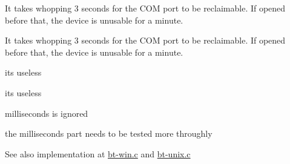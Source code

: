 
\begin{DoxyRefList}
\item[\label{bug__bug000006}%
\hypertarget{bug__bug000006}{}%
global\+Scope$>$ Global \hyperlink{btserial_8h_ac55022b02ba1040cb1ee132abd82e989}{bt\+\_\+close} (void $\ast$)]It takes whopping 3 seconds for the C\+O\+M port to be reclaimable. If opened before that, the device is unusable for a minute.  
\item[\label{bug__bug000006}%
\hypertarget{bug__bug000006}{}%
global\+Scope$>$ Global \hyperlink{btserial_8h_ac55022b02ba1040cb1ee132abd82e989}{bt\+\_\+close} (void $\ast$)]It takes whopping 3 seconds for the C\+O\+M port to be reclaimable. If opened before that, the device is unusable for a minute.  
\item[\label{bug__bug000009}%
\hypertarget{bug__bug000009}{}%
global\+Scope$>$ Global \hyperlink{btserial_8h_ad7be1494a76a1058ec4ba51588a09109}{bt\+\_\+error} (void $\ast$device)]it\textquotesingle{}s useless  
\item[\label{bug__bug000009}%
\hypertarget{bug__bug000009}{}%
global\+Scope$>$ Global \hyperlink{btserial_8h_ad7be1494a76a1058ec4ba51588a09109}{bt\+\_\+error} (void $\ast$device)]it\textquotesingle{}s useless  
\item[\label{bug__bug000005}%
\hypertarget{bug__bug000005}{}%
global\+Scope$>$ Global \hyperlink{bt-win_8c_a5861a216864bb97223f98e631f0c667c}{bt\+\_\+read} (void $\ast$handle, u8 $\ast$buf, size\+\_\+t count, int milliseconds)]milliseconds is ignored  
\item[\label{bug__bug000008}%
\hypertarget{bug__bug000008}{}%
global\+Scope$>$ Global \hyperlink{btserial_8h_a1b964cfcb627fd4cda8298d8f2d9f0d3}{bt\+\_\+read} (void $\ast$device, u8 $\ast$buf, size\+\_\+t count, int milliseconds)]the milliseconds part needs to be tested more throughly \begin{DoxySeeAlso}{See also}
implementation at \hyperlink{bt-win_8c}{bt-\/win.\+c} and \hyperlink{bt-unix_8c}{bt-\/unix.\+c}  
\end{DoxySeeAlso}


\end{DoxyRefList}
